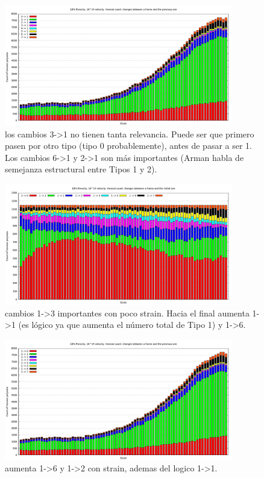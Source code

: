 \documentclass[10pt, oneside]{article} %
\begin{document}
\begin{figure}[H]
\centering
\includegraphics[width=10cm]{Figures/Porosidad/Porosidad_2vel_comp_voronoi_hist2.png}
\caption{los cambios 3->1 no tienen tanta relevancia. Puede ser que primero pasen por otro tipo (tipo 0 probablemente), antes de pasar a ser 1.  Los cambios 6->1 y 2->1 son más importantes (Arman habla de semejanza estructural entre Tipos 1 y 2).}
\end{figure}

\begin{figure}[H]
\centering
\includegraphics[width=10cm]{Figures/Porosidad/Porosidad_2vel_comp_voronoi_hist3.png}
\caption{cambios 1->3 importantes con poco strain. Hacia el final aumenta 1->1 (es lógico ya que aumenta el número total de Tipo 1) y 1->6.}
\label{fg:12comp}
\end{figure}

\begin{figure}[H]
\centering
\includegraphics[width=10cm]{Figures/Porosidad/Porosidad_2vel_comp_voronoi_hist4.png}
\caption{aumenta 1->6 y 1->2 con strain, ademas del logico 1->1.}
\end{figure}
\end{document}
